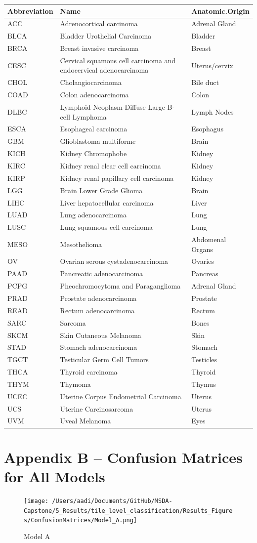 \documentclass[12pt,]{article}
\begin{document}
\begin{longtable}[c]{@{}lll@{}}
\toprule
Abbreviation & Name & Anatomic.Origin\tabularnewline
\midrule
\endhead
ACC & Adrenocortical carcinoma & Adrenal Gland\tabularnewline
BLCA & Bladder Urothelial Carcinoma & Bladder\tabularnewline
BRCA & Breast invasive carcinoma & Breast\tabularnewline
CESC & Cervical squamous cell carcinoma and endocervical adenocarcinoma
& Uterus/cervix\tabularnewline
CHOL & Cholangiocarcinoma & Bile duct\tabularnewline
COAD & Colon adenocarcinoma & Colon\tabularnewline
DLBC & Lymphoid Neoplasm Diffuse Large B-cell Lymphoma & Lymph
Nodes\tabularnewline
ESCA & Esophageal carcinoma & Esophagus\tabularnewline
GBM & Glioblastoma multiforme & Brain\tabularnewline
KICH & Kidney Chromophobe & Kidney\tabularnewline
KIRC & Kidney renal clear cell carcinoma & Kidney\tabularnewline
KIRP & Kidney renal papillary cell carcinoma & Kidney\tabularnewline
LGG & Brain Lower Grade Glioma & Brain\tabularnewline
LIHC & Liver hepatocellular carcinoma & Liver\tabularnewline
LUAD & Lung adenocarcinoma & Lung\tabularnewline
LUSC & Lung squamous cell carcinoma & Lung\tabularnewline
MESO & Mesothelioma & Abdomenal Organs\tabularnewline
OV & Ovarian serous cystadenocarcinoma & Ovaries\tabularnewline
PAAD & Pancreatic adenocarcinoma & Pancreas\tabularnewline
PCPG & Pheochromocytoma and Paraganglioma & Adrenal Gland\tabularnewline
PRAD & Prostate adenocarcinoma & Prostate\tabularnewline
READ & Rectum adenocarcinoma & Rectum\tabularnewline
SARC & Sarcoma & Bones\tabularnewline
SKCM & Skin Cutaneous Melanoma & Skin\tabularnewline
STAD & Stomach adenocarcinoma & Stomach\tabularnewline
TGCT & Testicular Germ Cell Tumors & Testicles\tabularnewline
THCA & Thyroid carcinoma & Thyroid\tabularnewline
THYM & Thymoma & Thymus\tabularnewline
UCEC & Uterine Corpus Endometrial Carcinoma & Uterus\tabularnewline
UCS & Uterine Carcinosarcoma & Uterus\tabularnewline
UVM & Uveal Melanoma & Eyes\tabularnewline
\bottomrule
\end{longtable}

\newpage

\section{Appendix B -- Confusion Matrices for All
Models}\label{appendix-b-confusion-matrices-for-all-models}

\begin{figure}[htbp]
\centering
\texttt{[image: /Users/aadi/Documents/GitHub/MSDA-Capstone/5\_Results/tile\_level\_classification/Results\_Figures/ConfusionMatrices/Model\_A.png]}
\caption{Model A}
\end{figure}
\end{document}
